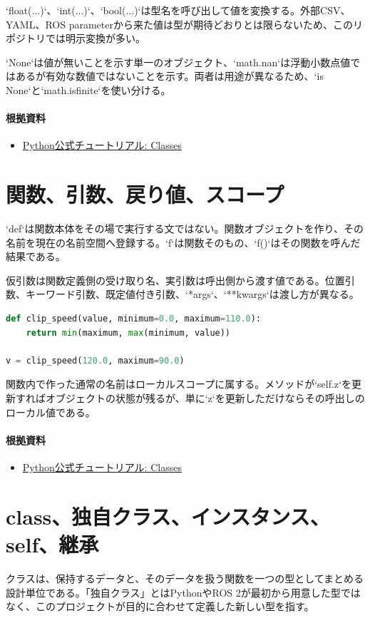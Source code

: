 \documentclass[a4paper,11pt]{article}
\begin{document}
`float(...)`、`int(...)`、`bool(...)`は型名を呼び出して値を変換する。外部CSV、YAML、ROS parameterから来た値は型が期待どおりとは限らないため、このリポジトリでは明示変換が多い。


`None`は値が無いことを示す単一のオブジェクト、`math.nan`は浮動小数点値ではあるが有効な数値ではないことを示す。両者は用途が異なるため、`is None`と`math.isfinite`を使い分ける。

\paragraph{根拠資料}
\begin{itemize}[leftmargin=1.6em]
\item \href{https://docs.python.org/3/tutorial/classes.html}{Python公式チュートリアル: Classes}
\end{itemize}

\section{関数、引数、戻り値、スコープ}
`def`は関数本体をその場で実行する文ではない。関数オブジェクトを作り、その名前を現在の名前空間へ登録する。`f`は関数そのもの、`f()`はその関数を呼んだ結果である。


仮引数は関数定義側の受け取り名、実引数は呼出側から渡す値である。位置引数、キーワード引数、既定値付き引数、`*args`、`**kwargs`は渡し方が異なる。


\begin{lstlisting}[language=python]
def clip_speed(value, minimum=0.0, maximum=110.0):
    return min(maximum, max(minimum, value))

v = clip_speed(120.0, maximum=90.0)
\end{lstlisting}


関数内で作った通常の名前はローカルスコープに属する。メソッドが`self.z`を更新すればオブジェクトの状態が残るが、単に`z`を更新しただけならその呼出しのローカル値である。

\paragraph{根拠資料}
\begin{itemize}[leftmargin=1.6em]
\item \href{https://docs.python.org/3/tutorial/classes.html}{Python公式チュートリアル: Classes}
\end{itemize}

\section{class、独自クラス、インスタンス、self、継承}
クラスは、保持するデータと、そのデータを扱う関数を一つの型としてまとめる設計単位である。「独自クラス」とはPythonやROS 2が最初から用意した型ではなく、このプロジェクトが目的に合わせて定義した新しい型を指す。
\end{document}
